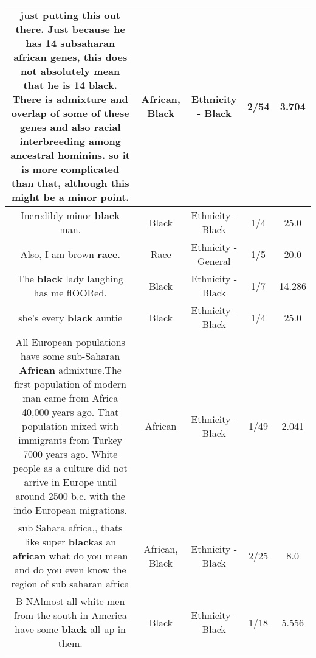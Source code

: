 \documentclass[11pt]{article}
\newlength\mylength
\begin{document}
\begin{center}
\begin{longtable}{|C{.65\mylength}|C{.30\mylength}|C{.12\mylength}|C{.12\mylength}|C{.12\mylength}|}
  \small just putting this out there.  Just because he has 14 subsaharan \textbf{african} genes, this does not absolutely mean that he is 14 \textbf{black}.  There is admixture and overlap of some of these genes and also racial interbreeding among ancestral hominins.  so it is more complicated than that, although this might be a minor point.\normalsize   & African, Black & Ethnicity - Black & 2/54 & 3.704 \\  \hline
  \small Incredibly minor \textbf{black} man.\normalsize   & Black & Ethnicity - Black & 1/4 & 25.0 \\  \hline
  \small Also, I am brown \textbf{race}.\normalsize   & Race & Ethnicity - General & 1/5 & 20.0 \\  \hline
  \small The \textbf{black} lady laughing has me flOORed.\normalsize   & Black & Ethnicity - Black & 1/7 & 14.286 \\  \hline
  \small she's every \textbf{black} auntie\normalsize   & Black & Ethnicity - Black & 1/4 & 25.0 \\  \hline
  \small All European populations have some sub-Saharan \textbf{African} admixture.The first population of modern man came from Africa 40,000 years ago. That population mixed with immigrants from Turkey 7000 years ago. White people as a culture did not arrive in Europe until around 2500 b.c. with the indo European migrations.\normalsize   & African & Ethnicity - Black & 1/49 & 2.041 \\  \hline
  \small sub Sahara africa,, thats like super \textbf{black}as an \textbf{african} what do you mean and do you even know the region of sub saharan africa\normalsize   & African, Black & Ethnicity - Black & 2/25 & 8.0 \\  \hline
  \small B NAlmost all white men from the south in America have some \textbf{black} all up in them.\normalsize   & Black & Ethnicity - Black & 1/18 & 5.556 \\  \hline

\end{longtable}
\end{center}
\end{document}
